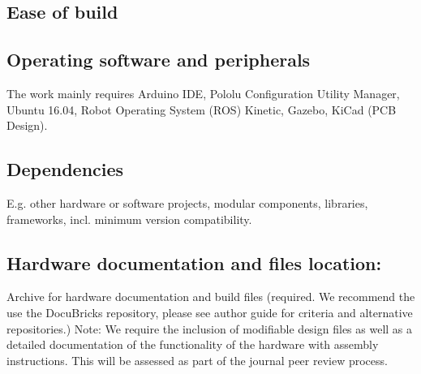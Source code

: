 \documentclass[a4paper]{article}
\begin{document}


\subsection{Ease of build}\label{h.wg823sgyb1e4}



\subsection{Operating software and peripherals}\label{h.uz77dixfh5i4}



The work mainly requires Arduino IDE, Pololu Configuration Utility Manager, Ubuntu 16.04, Robot Operating System (ROS) Kinetic, Gazebo, KiCad (PCB Design). 


\subsection{Dependencies}\label{h.vr0vnjs8z9ar}

E.g. other hardware or software projects, modular components,
libraries, frameworks, incl. minimum version compatibility.


\subsection{Hardware documentation and files location:}\label{h.nbisrsde6sc3}

Archive for hardware documentation and build files (required.
We recommend the use the DocuBricks repository, please see author guide for criteria and alternative
repositories.) Note: We require the inclusion of modifiable design
files as well as a detailed documentation of the functionality of the
hardware with assembly instructions. This will be assessed as part of
the journal peer review process.
\end{document}
